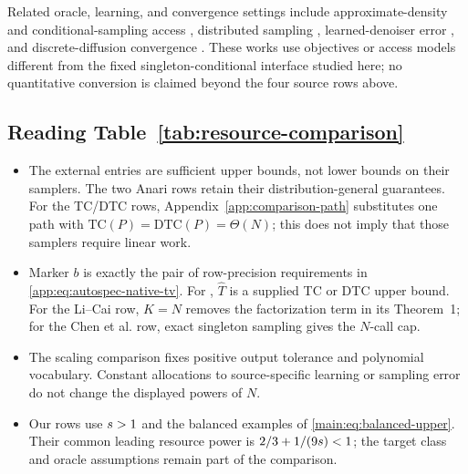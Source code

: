 Related oracle, learning, and convergence settings include approximate-density
and conditional-sampling access
\citep{golowich2026testtime,canonne2015conditional,canonne2021random,
chen2021junta,blanca2023coordinate}, distributed sampling
\citep{feng2020local}, learned-denoiser error
\citep{wakasugi2025state}, and discrete-diffusion convergence
\citep{zhang2025convergence,ren2025discrete,liang2025absorb}.
These works use objectives or access models different from the fixed
singleton-conditional interface studied here; no quantitative conversion is
claimed beyond the four source rows above.

\subsection{Reading Table~\ref{tab:resource-comparison}}
\label{app:comparison-table-notes}

\begin{itemize}
\item The external entries are sufficient upper bounds, not lower bounds on
their samplers.  The two Anari rows retain their distribution-general
guarantees.  For the TC/DTC rows, Appendix~\ref{app:comparison-path}
substitutes one path with
$\mathrm{TC}(P)=\mathrm{DTC}(P)=\Theta(N)$; this does not imply that those
samplers require linear work.

\item Marker $b$ is exactly the pair of row-precision requirements in
\eqref{app:eq:autospec-native-tv}.  For
\citet{chen2026optimal}, $\widehat T$ is a supplied TC or DTC upper bound.
For the Li--Cai row, $K=N$ removes the factorization term in its Theorem~1;
for the Chen et al. row, exact singleton sampling gives the $N$-call cap.

\item The scaling comparison fixes positive output tolerance and polynomial
vocabulary.  Constant allocations to source-specific learning or sampling
error do not change the displayed powers of $N$.

\item Our rows use $s>1$ and the balanced examples of
\eqref{main:eq:balanced-upper}.  Their common leading resource power is
$2/3+1/(9s)<1$; the target class and oracle assumptions remain
part of the comparison.
\end{itemize}
